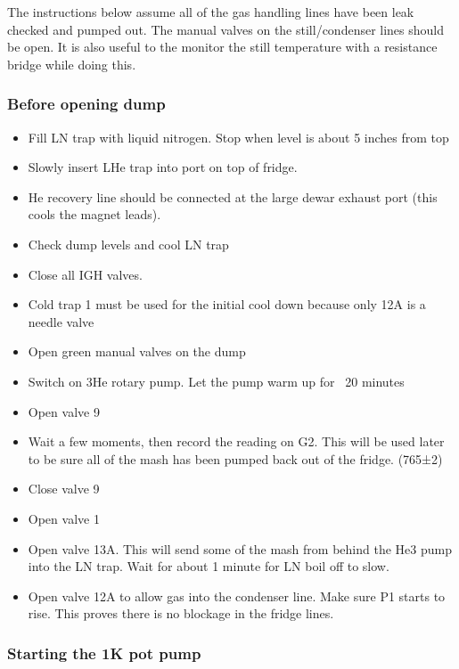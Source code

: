 The instructions below assume all of the gas handling lines have been leak checked and pumped out. The manual valves on the still/condenser lines should be open. It is also useful to the monitor the still temperature with a resistance bridge while doing this.

\subsubsection*{Before opening dump}

\begin{itemize}
\item Fill LN trap with liquid nitrogen. Stop when level is about 5 inches from top
\item Slowly insert LHe trap into port on top of fridge. 
\item He recovery line should be connected at the large dewar exhaust port (this cools the magnet leads).
\item Check dump levels and cool LN trap
\item Close all IGH valves. 
\item Cold trap 1 must be used for the initial cool down because only 12A is a needle valve
\item Open green manual valves on the dump
\item Switch on 3He rotary pump. Let the pump warm up for ~20 minutes
\item Open valve 9
\item Wait a few moments, then record the reading on G2. This will be used later to be sure all of the mash has been pumped back out of the fridge. (765±2)
\item Close valve 9
\item Open valve 1
\item Open valve 13A. This will send some of the mash from behind the He3 pump into the LN trap. Wait for about 1 minute for LN boil off to slow.
\item Open valve 12A to allow gas into the condenser line. Make sure P1 starts to rise. This proves there is no blockage in the fridge lines.
\end{itemize}

\subsubsection*{Starting the 1K pot pump}

